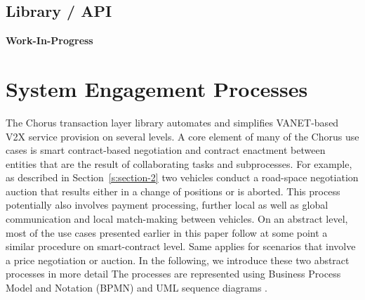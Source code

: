 \documentclass{llncs}
\begin{document}
{%
%		
%		
%		
%		
%		



		
		\subsection{Library / API}
			\label{ss:library-api}				
			\textbf{Work-In-Progress}
			

	
	\section{System Engagement Processes}
		\label{s:section-5}	
	
	
		The Chorus transaction layer library automates and simplifies VANET-based V2X service provision on several levels. A core element of many of the Chorus use cases is smart contract-based negotiation and contract enactment between entities that are the result of collaborating tasks and subprocesses. For example, as described in Section~\ref{s:section-2} two vehicles conduct a road-space negotiation auction that results either in a change of positions or is aborted. This process potentially also involves payment processing, further local as well as global communication and local match-making between vehicles. On an abstract level, most of the use cases presented earlier in this paper follow at some point a similar procedure on smart-contract level. Same applies for scenarios that involve a price negotiation or auction. In the following, we introduce these two abstract processes in more detail
		The processes are represented using Business Process Model and Notation (BPMN) \cite{model2011notation} and UML sequence diagrams \cite{msequenceDiagrams}.
		
}
\end{document}
